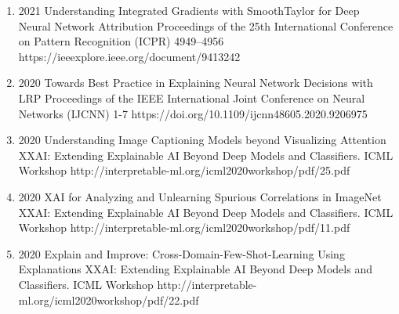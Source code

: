 \documentclass[10pt,a4paper]{article} %
\begin{document}
{\begin{enumerate}
        \item {}
                                {2021}
                                {Understanding Integrated Gradients with SmoothTaylor for Deep Neural Network Attribution}
                                {Proceedings of the 25th International Conference on Pattern Recognition (ICPR)}
                                {4949--4956}
                                {https://ieeexplore.ieee.org/document/9413242}

        \item {}
                                {2020}
                                {Towards Best Practice in Explaining Neural Network Decisions with LRP}
                                {Proceedings of the IEEE International Joint Conference on Neural Networks (IJCNN)}
                                {1-7}
                                {https://doi.org/10.1109/ijcnn48605.2020.9206975}

        \item {}
                                {2020}
                                {Understanding Image Captioning Models beyond Visualizing Attention}
                                {XXAI: Extending Explainable AI Beyond Deep Models and Classifiers. ICML Workshop}
                                {}
                                {http://interpretable-ml.org/icml2020workshop/pdf/25.pdf}


        \item {}
                                {2020}
                                {XAI for Analyzing and Unlearning Spurious Correlations in ImageNet}
                                {XXAI: Extending Explainable AI Beyond Deep Models and Classifiers. ICML Workshop}
                                {}
                                {http://interpretable-ml.org/icml2020workshop/pdf/11.pdf}


        \item {}
                                {2020}
                                {Explain and Improve: Cross-Domain-Few-Shot-Learning Using Explanations}
                                {XXAI: Extending Explainable AI Beyond Deep Models and Classifiers. ICML Workshop}
                                {}
                                {http://interpretable-ml.org/icml2020workshop/pdf/22.pdf}



\end{enumerate}}
\end{document}
